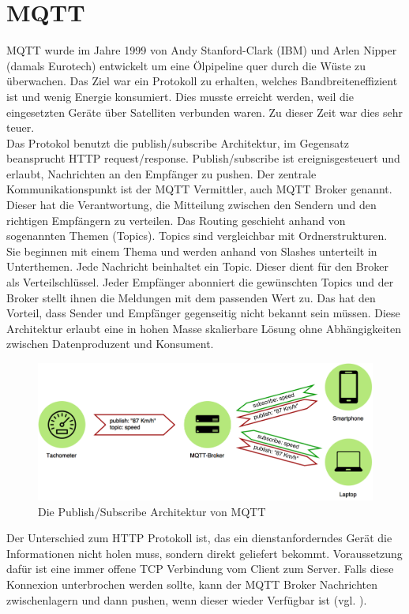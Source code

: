 \section{MQTT}
\gls{MQTT} wurde im Jahre 1999 von Andy Stanford-Clark (IBM) und Arlen Nipper (damals Eurotech) entwickelt um eine Ölpipeline quer durch die Wüste zu überwachen. Das Ziel war ein Protokoll zu erhalten, welches Bandbreiteneffizient ist und wenig Energie konsumiert. Dies musste erreicht werden, weil die eingesetzten Geräte über Satelliten verbunden waren. Zu dieser Zeit war dies sehr teuer.\\
Das Protokol benutzt die publish/subscribe Architektur, im Gegensatz beansprucht HTTP request/response. Publish/subscribe ist ereignisgesteuert und erlaubt, Nachrichten an den Empfänger zu pushen. Der zentrale Kommunikationspunkt ist der \gls{MQTT} Vermittler, auch \gls{MQTT} Broker genannt. Dieser hat die Verantwortung, die Mitteilung zwischen den Sendern und den richtigen Empfängern zu verteilen. Das Routing geschieht anhand von sogenannten Themen (Topics). Topics sind vergleichbar mit Ordnerstrukturen. Sie beginnen mit einem Thema und werden anhand von Slashes unterteilt in Unterthemen. Jede Nachricht beinhaltet ein Topic. Dieser dient für den Broker als Verteilschlüssel. Jeder Empfänger abonniert die gewünschten Topics und der Broker stellt ihnen die Meldungen mit dem passenden Wert zu. Das hat den Vorteil, dass Sender und Empfänger gegenseitig nicht bekannt sein müssen. Diese Architektur erlaubt eine in hohen Masse skalierbare Lösung ohne Abhängigkeiten zwischen Datenproduzent und Konsument.\\
\begin{figure}[H]
  \centering
  \includegraphics[scale=0.3]{98_Bilder/02_Grundlagen/MQTT}
  \caption[\gls{MQTT} Architektur]{Die Publish/Subscribe Architektur von \gls{MQTT}}
\end{figure}
Der Unterschied zum HTTP Protokoll ist, das ein dienstanforderndes Gerät die Informationen nicht holen muss, sondern direkt geliefert bekommt. Voraussetzung dafür ist eine immer offene TCP Verbindung vom Client zum Server. Falls diese Konnexion unterbrochen werden sollte, kann der \gls{MQTT} Broker Nachrichten zwischenlagern und dann pushen, wenn dieser wieder Verfügbar ist (vgl. \cite{hive:mqtt}).

